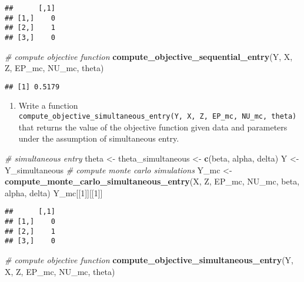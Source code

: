 \documentclass[
]{book}
\newenvironment{Shaded}{\begin{snugshade}}{\end{snugshade}}
\newcommand{\CommentTok}[1]{\textcolor[rgb]{0.56,0.35,0.01}{\textit{#1}}}
\newcommand{\DecValTok}[1]{\textcolor[rgb]{0.00,0.00,0.81}{#1}}
\newcommand{\KeywordTok}[1]{\textcolor[rgb]{0.13,0.29,0.53}{\textbf{#1}}}
\newcommand{\NormalTok}[1]{#1}
\newcommand{\StringTok}[1]{\textcolor[rgb]{0.31,0.60,0.02}{#1}}
\providecommand{\tightlist}{%
  \setlength{\itemsep}{0pt}\setlength{\parskip}{0pt}}
\begin{document}
\begin{verbatim}
##      [,1]
## [1,]    0
## [2,]    1
## [3,]    0
\end{verbatim}

\begin{Shaded}
\begin{Highlighting}[]
\CommentTok{# compute objective function}
\KeywordTok{compute_objective_sequential_entry}\NormalTok{(Y, X, Z, EP_mc, NU_mc, theta)}
\end{Highlighting}
\end{Shaded}

\begin{verbatim}
## [1] 0.5179
\end{verbatim}

\begin{enumerate}
\def\labelenumi{\arabic{enumi}.}
\setcounter{enumi}{2}
\tightlist
\item
  Write a function \texttt{compute\_objective\_simultaneous\_entry(Y,\ X,\ Z,\ EP\_mc,\ NU\_mc,\ theta)} that returns the value of the objective function given data and parameters under the assumption of simultaneous entry.
\end{enumerate}

\begin{Shaded}
\begin{Highlighting}[]
\CommentTok{# simultaneous entry}
\NormalTok{theta <-}\StringTok{ }\NormalTok{theta_simultaneous <-}
\StringTok{  }\KeywordTok{c}\NormalTok{(beta, alpha, delta)}
\NormalTok{Y <-}\StringTok{ }\NormalTok{Y_simultaneous}
\CommentTok{# compute monte carlo simulations}
\NormalTok{Y_mc <-}\StringTok{ }\KeywordTok{compute_monte_carlo_simultaneous_entry}\NormalTok{(X, Z, EP_mc, NU_mc, beta, alpha, delta)}
\NormalTok{Y_mc[[}\DecValTok{1}\NormalTok{]][[}\DecValTok{1}\NormalTok{]]}
\end{Highlighting}
\end{Shaded}

\begin{verbatim}
##      [,1]
## [1,]    0
## [2,]    1
## [3,]    0
\end{verbatim}

\begin{Shaded}
\begin{Highlighting}[]
\CommentTok{# compute objective function}
\KeywordTok{compute_objective_simultaneous_entry}\NormalTok{(Y, X, Z, EP_mc, NU_mc, theta)}
\end{Highlighting}
\end{Shaded}
\end{document}
